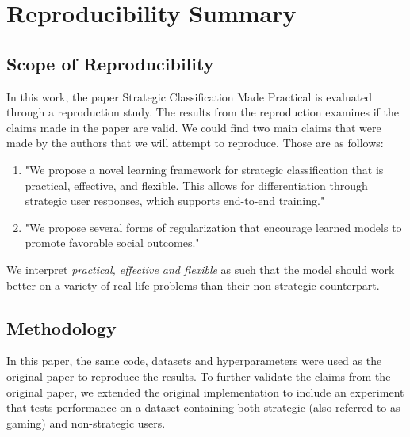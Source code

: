 %

\author{}


\section*{\centering Reproducibility Summary}


\subsection*{Scope of Reproducibility}

In this work, the paper Strategic Classification Made Practical\cite{levanon2021strategic} is evaluated through a reproduction study. The results from the reproduction examines if the claims made in the paper are valid. We could find two main claims that were made by the authors that we will attempt to reproduce. Those are as follows:

\begin{enumerate}
    \item "We propose a novel learning framework for strategic classification that is practical, effective, and flexible. This allows for differentiation through strategic user responses, which supports end-to-end training."
    \item "We propose several forms of regularization that encourage learned models to promote favorable social outcomes."
\end{enumerate}

We interpret \textit{practical, effective and flexible} as such that the model should work better on a variety of real life problems than their non-strategic counterpart.

\subsection*{Methodology}

In this paper, the same code, datasets and hyperparameters were used as the original paper to reproduce the results.
To further validate the claims from the original paper, we extended the original implementation to include an experiment that tests performance on a dataset containing both strategic (also referred to as gaming) and non-strategic users.

